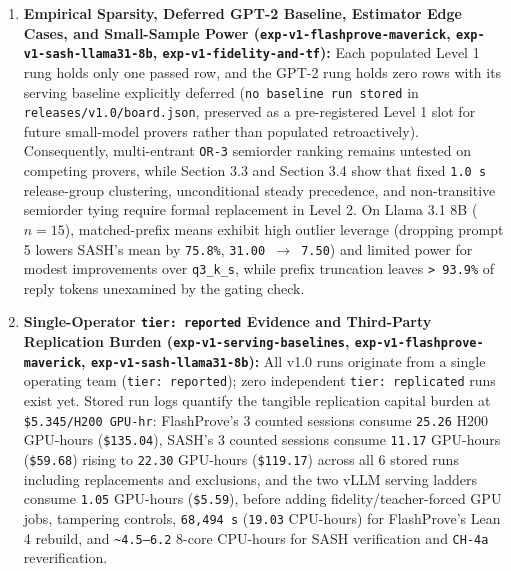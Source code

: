 \documentclass[11pt,letterpaper]{article}
\begin{document}
\begin{enumerate}
\item \textbf{Empirical Sparsity, Deferred GPT-2 Baseline, Estimator Edge Cases, and Small-Sample Power (\texttt{exp-\allowbreak{}v1-\allowbreak{}flashprove-\allowbreak{}maverick}, \texttt{exp-\allowbreak{}v1-\allowbreak{}sash-\allowbreak{}llama31-8b}, \texttt{exp-\allowbreak{}v1-\allowbreak{}fidelity-\allowbreak{}and-\allowbreak{}tf}):} Each populated Level 1 rung holds only one passed row, and the GPT-2 rung holds zero rows with its serving baseline explicitly deferred (\texttt{no baseline run stored} in \texttt{releases/\allowbreak{}v1.0/\allowbreak{}board.\allowbreak{}json}, preserved as a pre-registered Level 1 slot for future small-model provers rather than populated retroactively). Consequently, multi-entrant \texttt{OR-3} semiorder ranking remains untested on competing provers, while Section 3.3 and Section 3.4 show that fixed \texttt{1.0 s} release-group clustering, unconditional steady precedence, and non-transitive semiorder tying require formal replacement in Level 2. On Llama 3.1 8B ($n = 15$), matched-prefix means exhibit high outlier leverage (dropping prompt 5 lowers SASH's mean by \texttt{75.8\%}, \texttt{31.00 $\rightarrow$ 7.50}) and limited power for modest improvements over \texttt{q3\_\allowbreak{}k\_\allowbreak{}s}, while prefix truncation leaves \texttt{> 93.9\%} of reply tokens unexamined by the gating check.
\item \textbf{Single-Operator \texttt{tier: reported} Evidence and Third-Party Replication Burden (\texttt{exp-\allowbreak{}v1-\allowbreak{}serving-\allowbreak{}baselines}, \texttt{exp-\allowbreak{}v1-\allowbreak{}flashprove-\allowbreak{}maverick}, \texttt{exp-\allowbreak{}v1-\allowbreak{}sash-\allowbreak{}llama31-8b}):} All v1.0 runs originate from a single operating team (\texttt{tier: reported}); zero independent \texttt{tier: replicated} runs exist yet. Stored run logs quantify the tangible replication capital burden at \texttt{\$5.345/\allowbreak{}H200 GPU-\allowbreak{}hr}: FlashProve's 3 counted sessions consume \texttt{25.26} H200 GPU-hours (\texttt{\$135.04}), SASH's 3 counted sessions consume \texttt{11.17} GPU-hours (\texttt{\$59.68}) rising to \texttt{22.30} GPU-hours (\texttt{\$119.17}) across all 6 stored runs including replacements and exclusions, and the two vLLM serving ladders consume \texttt{1.05} GPU-hours (\texttt{\$5.59}), before adding fidelity/teacher-forced GPU jobs, tampering controls, \texttt{68,494 s} (\texttt{19.03} CPU-hours) for FlashProve's Lean 4 rebuild, and \texttt{\textasciitilde{}4.5--6.2} 8-core CPU-hours for SASH verification and \texttt{CH-4a} reverification.

\end{enumerate}
\end{document}
